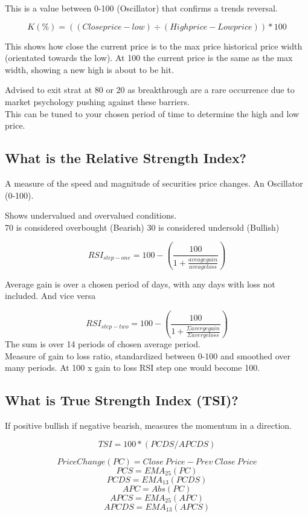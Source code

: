 \documentclass[11pt]{scrartcl} %
\begin{document}
This is a value between 0-100 (Oscillator) that confirms a trends reversal.

\[ K(\%) = ((Close price - low) \div (High price - Low price)) * 100\] 

This shows how close the current price is to the max price historical price width (orientated towards the low).
At 100 the current price is the same as the max width, showing a new high is about to be hit.

Advised to exit strat at 80 or 20 as breakthrough are a rare occurrence due to market psychology pushing
against these barriers.\\

This can be tuned to your chosen period of time to determine the high and low price.

\subsection{What is the Relative Strength Index?}

A measure of the speed and magnitude of securities price changes. An Oscillator (0-100).

Shows undervalued and overvalued conditions.\\

70 is considered overbought (Bearish)
30 is considered undersold (Bullish)

\[ RSI_{step-one} = 100 - (\frac{100}{1+\frac{aveage gain}{aveage loss}}) \]

Average gain is over a chosen period of days, with any days with loss not included. And vice versa

\[ RSI_{step-two} = 100 - (\frac{100}{1+ \frac{\Sigma avergegain}{\Sigma averge loss}}) \]
The sum is over 14 periods of chosen average period.\\

Measure of gain to loss ratio, standardized between 0-100 and smoothed over many periods. At 100 x gain to loss RSI step one would become 100.

\subsection{What is True Strength Index (TSI)?}

If positive bullish if negative bearish, measures the momentum in a direction.

\[ TSI = 100*(PCDS/APCDS) \]

\[ PriceChange(PC) = Close\:Price -Prev\:Close\:Price \]
\[PCS = EMA_{25}(PC) \]
\[PCDS = EMA_{13}(PCDS) \]
\[ APC = Abs(PC) \]
\[ APCS = EMA_{25}(APC) \]
\[ APCDS = EMA_{13}(APCS) \]
\end{document}

